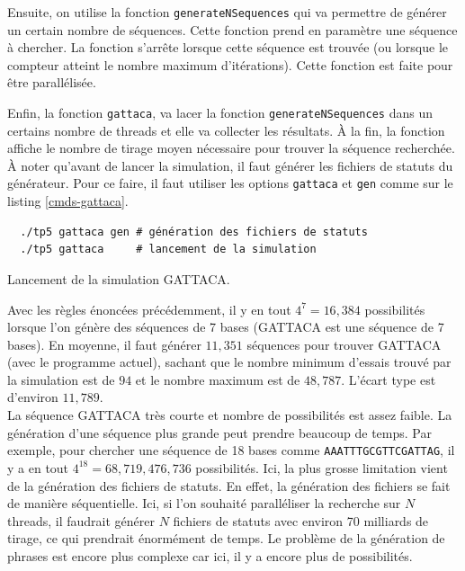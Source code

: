 \documentclass[a4paper]{article}
\begin{document}
Ensuite, on utilise la fonction \lstinline{generateNSequences} qui va permettre
de générer un certain nombre de séquences. Cette fonction prend en paramètre une
séquence à chercher. La fonction s'arrête lorsque cette séquence est trouvée (ou
lorsque le compteur atteint le nombre maximum d'itérations). Cette fonction est
faite pour être parallélisée.

Enfin, la fonction \lstinline{gattaca}, va lacer la fonction
\lstinline{generateNSequences} dans un certains nombre de threads et elle va
collecter les résultats. À la fin, la fonction affiche le nombre de tirage moyen
nécessaire pour trouver la séquence recherchée.\\

À noter qu'avant de lancer la simulation, il faut générer les fichiers de
statuts du générateur. Pour ce faire, il faut utiliser les options
\lstinline{gattaca} et \lstinline{gen} comme sur le listing \ref{cmds-gattaca}.

\begin{listing}[ht!]
\begin{verbatim}
  ./tp5 gattaca gen # génération des fichiers de statuts
  ./tp5 gattaca     # lancement de la simulation
\end{verbatim}
\caption{Lancement de la simulation GATTACA.}
\label{cmds-gattaca}
\end{listing}

Avec les règles énoncées précédemment, il y en tout $4^7 = 16,384$ possibilités
lorsque l'on génère des séquences de 7 bases (GATTACA est une séquence de 7
bases). En moyenne, il faut générer $11,351$ séquences pour trouver GATTACA (avec
le programme actuel), sachant que le nombre minimum d'essais trouvé par la
simulation est de $94$ et le nombre maximum est de $48,787$. L'écart type est
d'environ $11,789$.\\

La séquence GATTACA très courte et nombre de possibilités est assez faible. La
génération d'une séquence plus grande peut prendre beaucoup de temps. Par
exemple, pour chercher une séquence de 18 bases comme
\lstinline{AAATTTGCGTTCGATTAG}, il y a en tout $4^{18} = 68,719,476,736$
possibilités. Ici, la plus grosse limitation vient de la génération des fichiers
de statuts. En effet, la génération des fichiers se fait de manière
séquentielle. Ici, si l'on souhaité paralléliser la recherche sur $N$ threads,
il faudrait générer $N$ fichiers de statuts avec environ 70 milliards de tirage,
ce qui prendrait énormément de temps. Le problème de la génération de phrases
est encore plus complexe car ici, il y a encore plus de possibilités.
\end{document}
